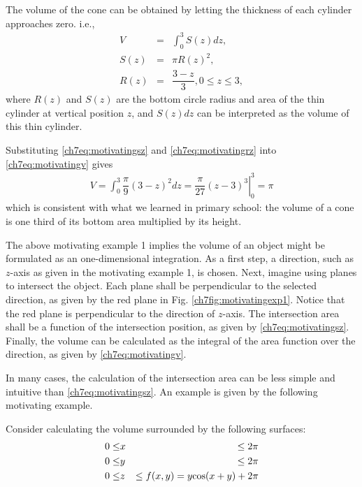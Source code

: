 The volume of the cone can be obtained by letting the thickness of each cylinder approaches zero. i.e.,
\begin{eqnarray}
  V &=& \int_{0}^{3}S(z)dz, \label{ch7eq:motivatingv} \\
  S(z) &=& \pi R(z)^2, \label{ch7eq:motivatingsz} \\
  R(z) &=& \dfrac{3-z}{3}, 0\leq z\leq 3, \label{ch7eq:motivatingrz}
\end{eqnarray}
where $R(z)$ and $S(z)$ are the bottom circle radius and area of the thin cylinder at vertical position $z$, and $S(z)dz$ can be interpreted as the volume of this thin cylinder.

Substituting \eqref{ch7eq:motivatingsz} and \eqref{ch7eq:motivatingrz} into \eqref{ch7eq:motivatingv} gives
\begin{eqnarray}
  V = \int_{0}^{3} \dfrac{\pi}{9} \left(3-z\right)^2 dz
  = \left.\dfrac{\pi}{27}(z-3)^3 \right|_0^3
  = \pi \nonumber
\end{eqnarray}
which is consistent with what we learned in primary school: the volume of a cone is one third of its bottom area multiplied by its height.

The above motivating example 1 implies the volume of an object might be formulated as an one-dimensional integration. As a first step, a direction, such as $z$-axis as given in the motivating example 1, is chosen. Next, imagine using planes to intersect the object. Each plane shall be perpendicular to the selected direction, as given by the red plane in Fig. \ref{ch7fig:motivatingexp1}. Notice that the red plane is perpendicular to the direction of $z$-axis. The intersection area shall be a function of the intersection position, as given by \eqref{ch7eq:motivatingsz}. Finally, the volume can be calculated as the integral of the area function over the direction, as given by \eqref{ch7eq:motivatingv}.

In many cases, the calculation of the intersection area can be less simple and intuitive than \eqref{ch7eq:motivatingsz}. An example is given by the following motivating example.

\begin{shortbox}
	
	Consider calculating the volume surrounded by the following surfaces:
	\begin{eqnarray}
		0\leq &x& \leq 2\pi \nonumber \\
		0\leq &y& \leq 2\pi \nonumber \\
		0\leq &z& \leq f(x,y) = y\textup{cos}(x+y)+2\pi \label{ch7eq:motivatingexp2f}
	\end{eqnarray}
	
\end{shortbox}

